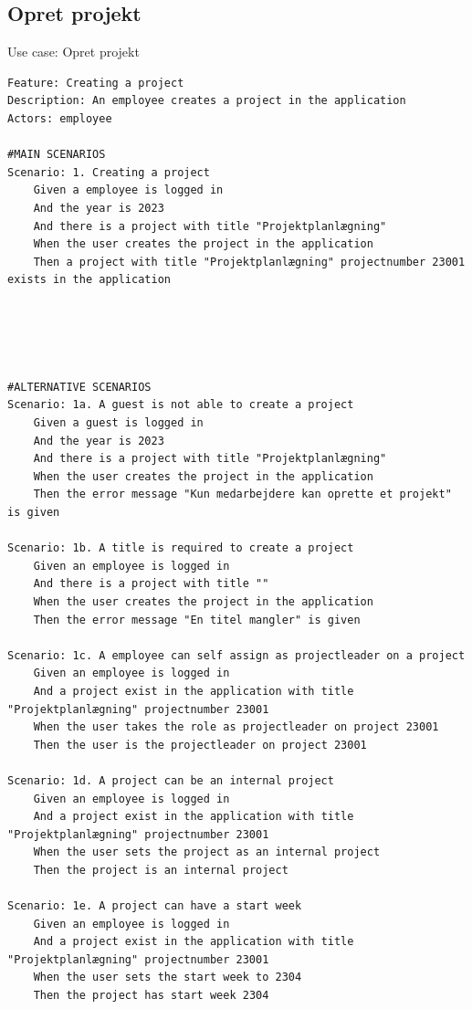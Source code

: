 \subsection{Opret projekt} 
\begin{listing}[H]
    \centering
    \caption{Use case: Opret projekt}\label{lst:usecase_create_project}
    \begin{verbatim}  
Feature: Creating a project
Description: An employee creates a project in the application
Actors: employee

#MAIN SCENARIOS
Scenario: 1. Creating a project
    Given a employee is logged in
    And the year is 2023
    And there is a project with title "Projektplanlægning" 
    When the user creates the project in the application 
    Then a project with title "Projektplanlægning" projectnumber 23001 exists in the application





#ALTERNATIVE SCENARIOS
Scenario: 1a. A guest is not able to create a project
    Given a guest is logged in
    And the year is 2023
    And there is a project with title "Projektplanlægning"  
    When the user creates the project in the application 
    Then the error message "Kun medarbejdere kan oprette et projekt" is given

Scenario: 1b. A title is required to create a project
    Given an employee is logged in
    And there is a project with title ""  
    When the user creates the project in the application 
    Then the error message "En titel mangler" is given

Scenario: 1c. A employee can self assign as projectleader on a project
    Given an employee is logged in
    And a project exist in the application with title "Projektplanlægning" projectnumber 23001
    When the user takes the role as projectleader on project 23001
    Then the user is the projectleader on project 23001

Scenario: 1d. A project can be an internal project
    Given an employee is logged in
    And a project exist in the application with title "Projektplanlægning" projectnumber 23001
    When the user sets the project as an internal project
    Then the project is an internal project

Scenario: 1e. A project can have a start week
    Given an employee is logged in
    And a project exist in the application with title "Projektplanlægning" projectnumber 23001
    When the user sets the start week to 2304
    Then the project has start week 2304
    
    \end{verbatim}
\end{listing}


